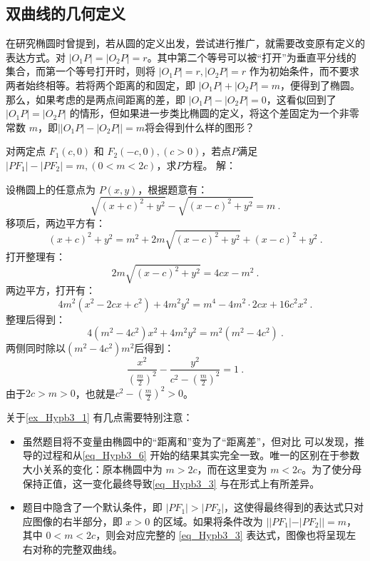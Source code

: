 \subsection{双曲线的几何定义}

在研究椭圆时曾提到，若从圆的定义出发，尝试进行推广，就需要改变原有定义的表达方式。对 $|O_1P| = |O_2P| = r$。其中第二个等号可以被“打开”为垂直平分线的集合，而第一个等号打开时，则将 $|O_1P| = r, |O_2P| = r$ 作为初始条件，而不要求两者始终相等。若将两个距离的和固定，即 $|O_1P| + |O_2P| = m$，便得到了椭圆。那么，如果考虑的是两点间距离的差，即 $|O_1P| - |O_2P| = 0$，这看似回到了 $|O_1P| = |O_2P|$ 的情形，但如果进一步类比椭圆的定义，将这个差固定为一个非零常数 $m$，即$\left||O_1P| - |O_2P|\right| = m$将会得到什么样的图形？

\begin{example}{对两定点 $F_1(c, 0)$ 和 $F_2(-c, 0),(c>0)$，若点$P$满足$|PF_1| - |PF_2| = m,(0<m <2c)$，求$P$方程。}
解：

设椭圆上的任意点为 $P(x, y)$，根据题意有：
\begin{equation}
\sqrt{(x + c)^2 + y^2} - \sqrt{(x - c)^2 + y^2} = m~.
\end{equation}
移项后，两边平方有：
\begin{equation}
(x + c)^2 + y^2 = m^2 + 2m\sqrt{(x - c)^2 + y^2} + (x - c)^2 + y^2~.
\end{equation}
打开整理有：
\begin{equation}
2m\sqrt{(x - c)^2 + y^2}= 4cx - m^2~.
\end{equation}
两边平方，打开有：
\begin{equation}\label{eq_Hypb3_6}
4m^2(x^2 - 2cx+c^2) + 4m^2y^2= m^4-4m^2\cdot2cx+16c^2x^2~.
\end{equation}
整理后得到：
\begin{equation}
4(m^2 -4c^2)x^2 + 4m^2y^2= m^2(m^2-4c^2)~.
\end{equation}
两侧同时除以$(m^2-4c^2)m^2$后得到：
\begin{equation}\label{eq_Hypb3_3}
\frac{x^2}{\left(\displaystyle\frac{m}{2}\right)^2} -\frac{y^2}{\displaystyle c^2-\left(\frac{m}{2}\right)^2}=1~.
\end{equation}
由于$2c>m>0$，也就是$\displaystyle c^2-\left(\frac{m}{2}\right)^2>0$。
\end{example}

关于\autoref{ex_Hypb3_1} 有几点需要特别注意：
\begin{itemize}
\item 虽然题目将不变量由椭圆中的“距离和”变为了“距离差”，但对比  可以发现，推导的过程和从\autoref{eq_Hypb3_6} 开始的结果其实完全一致。唯一的区别在于参数大小关系的变化：原本椭圆中为 $m > 2c$，而在这里变为 $m < 2c$。为了使分母保持正值，这一变化最终导致\autoref{eq_Hypb3_3} 与在形式上有所差异。
\item 题目中隐含了一个默认条件，即 $|PF_1| > |PF_2|$，这使得最终得到的表达式只对应图像的右半部分，即 $x > 0$ 的区域。如果将条件改为 $||PF_1| - |PF_2|| = m$，其中 $0 < m < 2c$，则会对应完整的 \autoref{eq_Hypb3_3} 表达式，图像也将呈现左右对称的完整双曲线。
\end{itemize}

